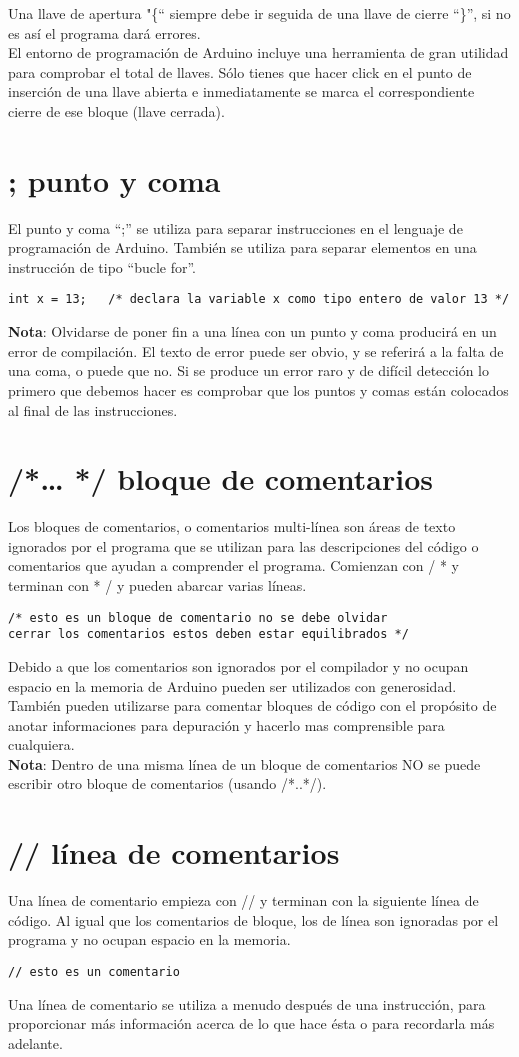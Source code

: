Una llave de apertura "\{“ siempre debe ir seguida de una llave de cierre “\}”, si no es así el programa dará errores.\\
El entorno de programación de Arduino incluye una herramienta de gran utilidad para comprobar el total de llaves. Sólo tienes que hacer click en el punto de inserción de una llave abierta e inmediatamente se marca el correspondiente cierre de ese bloque (llave cerrada).
\section{; punto y coma}
El punto y coma “;” se utiliza para separar instrucciones en el lenguaje de programación de Arduino. También se utiliza para separar elementos en una instrucción de tipo “bucle for”.
\begin{lstlisting}
int x = 13;   /* declara la variable x como tipo entero de valor 13 */
\end{lstlisting}
\textbf{Nota}: Olvidarse de poner fin a una línea con un punto y coma producirá en un error de compilación. El texto de error puede ser obvio, y se referirá a la falta de una coma, o puede que no. Si se produce un error raro y de difícil detección lo primero que debemos hacer es comprobar que los puntos y comas están colocados al final de las instrucciones.

\section{/*… */ bloque de comentarios}
Los bloques de comentarios, o comentarios multi-línea son áreas de texto ignorados por el programa que se utilizan para las descripciones del código o comentarios que ayudan a comprender el programa. Comienzan con / * y terminan con * / y pueden abarcar varias líneas.
\begin{lstlisting}
/* esto es un bloque de comentario no se debe olvidar
cerrar los comentarios estos deben estar equilibrados */
\end{lstlisting}
Debido a que los comentarios son ignorados por el compilador y no ocupan espacio en la memoria de Arduino pueden ser utilizados con generosidad. También pueden utilizarse para comentar bloques de código con el propósito de anotar informaciones para depuración y hacerlo mas comprensible para cualquiera.\\
\textbf{Nota}: Dentro de una misma línea de un bloque de comentarios NO se puede escribir otro bloque de comentarios (usando /*..*/).

\section{// línea de comentarios}
Una línea de comentario empieza con // y terminan con la siguiente línea de código. Al igual que los comentarios de bloque, los de línea son ignoradas por el programa y no ocupan espacio en la memoria.
\begin{lstlisting}
// esto es un comentario
\end{lstlisting}
Una línea de comentario se utiliza a menudo después de una instrucción, para proporcionar más información acerca de lo que hace ésta o para recordarla más adelante.